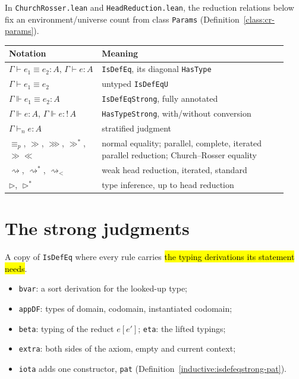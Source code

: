 \begin{remark}
 In \texttt{ChurchRosser.lean} and \texttt{HeadReduction.lean}, the reduction
relations below fix an environment/universe count from class \texttt{Params}
(Definition~\ref{class:cr-params}).
\par\smallskip\noindent
\begin{tabular}{p{0.31\linewidth}p{0.62\linewidth}}
\toprule
Notation & Meaning \\
\midrule
$\Gamma \vdash e_1 \equiv e_2 : A$, $\Gamma \vdash e : A$ & \texttt{IsDefEq}, its diagonal
\texttt{HasType} \\
$\Gamma \vdash e_1 \equiv e_2$ & untyped \texttt{IsDefEqU} \\
$\Gamma \Vdash e_1 \equiv e_2 : A$ & \texttt{IsDefEqStrong}, fully annotated \\
$\Gamma \Vdash e : A$, $\Gamma \Vdash e :!\,A$ & \texttt{HasTypeStrong}, with/without conversion \\
$\Gamma \vdash_n e : A$ & stratified judgment \\
$\equiv_p$, $\gg$, $\ggg$, $\gg^*$, $\gg\ll$ & normal equality; parallel, complete, iterated
parallel reduction; Church--Rosser equality \\
$\rightsquigarrow$, $\rightsquigarrow^*$, $\rightsquigarrow_<$ & weak head reduction, iterated,
standard \\
$\triangleright$, $\triangleright^*$ & type inference, up to head reduction \\
\bottomrule
\end{tabular}\par\smallskip
\end{remark}

\section{The strong judgments}

\begin{definition}
\label{def:isdefeqstrong}
\leanok
{}

 A copy of \texttt{IsDefEq} where every rule carries \hl{the typing derivations
its statement needs}.
\begin{itemize}
\item \texttt{bvar}: a sort derivation for the looked-up type;
\item \texttt{appDF}: types of domain, codomain, instantiated codomain;
\item \texttt{beta}: typing of the reduct $e[e']$; \texttt{eta}: the lifted typings;
\item \texttt{extra}: both sides of the axiom, empty and current context;
\item \texttt{iota} adds one constructor, \texttt{pat}
      (Definition~\ref{inductive:isdefeqstrong-pat}).
\end{itemize}
\end{definition}

